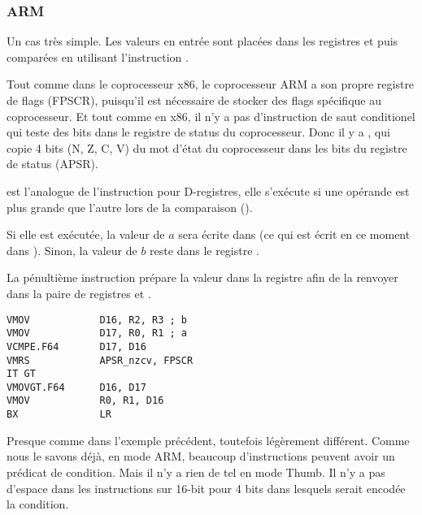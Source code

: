 \subsubsection{ARM}

\myparagraph{\OptimizingXcodeIV (\ARMMode)}



Un cas très simple.
Les valeurs en entrée sont placées dans les registres  et  puis
comparées en utilisant l'instruction .

Tout comme dans le coprocesseur x86, le coprocesseur ARM a son propre registre de
flags (\ac{FPSCR}), puisqu'il est nécessaire de stocker des flags spécifique au coprocesseur.
Et tout comme en x86, il n'y a pas d'instruction de saut conditionel qui teste des
bits dans le registre de status du coprocesseur.
Donc il y a , qui copie 4 bits (N, Z, C, V) du mot d'état du coprocesseur
dans les bits du registre de status  (\ac{APSR}).

 est l'analogue de l'instruction  pour D-registres, elle s'exécute
si une opérande est plus grande que l'autre lors de la comparaison ().

Si elle est exécutée, la valeur de $a$ sera écrite dans  (ce qui est écrit
en ce moment dans ).
Sinon, la valeur de $b$ reste dans le registre .


La pénultième instruction  prépare la valeur dans la registre 
afin de la renvoyer dans la paire de registres  et .

\myparagraph{\OptimizingXcodeIV (\ThumbTwoMode)}

\begin{lstlisting}[caption=\OptimizingXcodeIV (\ThumbTwoMode),style=customasmARM]
VMOV            D16, R2, R3 ; b
VMOV            D17, R0, R1 ; a
VCMPE.F64       D17, D16
VMRS            APSR_nzcv, FPSCR
IT GT 
VMOVGT.F64      D16, D17
VMOV            R0, R1, D16
BX              LR
\end{lstlisting}

Presque comme dans l'exemple précédent, toutefois légèrement différent.
Comme nous le savons déjà, en mode ARM, beaucoup d'instructions peuvent avoir un
prédicat de condition.
Mais il n'y a rien de tel en mode Thumb.
Il n'y a pas d'espace dans les instructions sur 16-bit pour 4 bits dans lesquels
serait encodée la condition.

